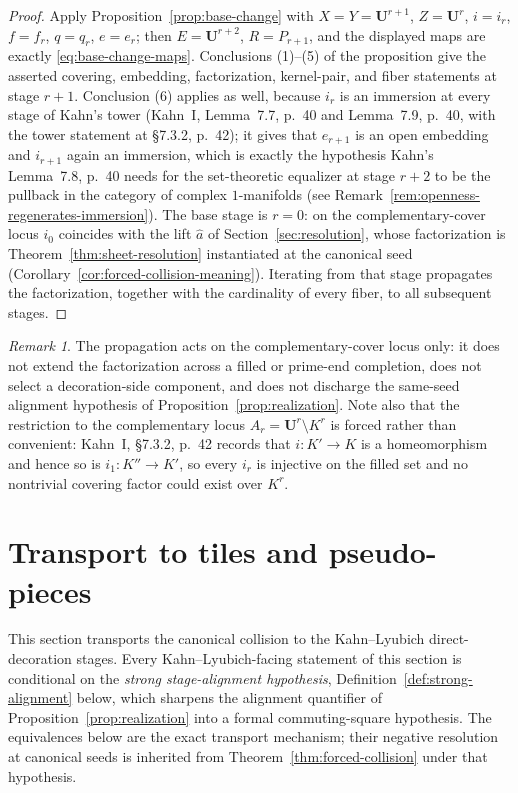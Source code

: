 \documentclass[11pt,reqno]{amsart}
\theoremstyle{definition}
\theoremstyle{remark}
\newtheorem{remark}[theorem]{Remark}
\begin{document}
\begin{proof}
Apply Proposition~\ref{prop:base-change} with \(X=Y=\mathbf U^{r+1}\), \(Z=\mathbf U^{r}\), \(i=i_r\), \(f=f_r\), \(q=q_r\), \(e=e_r\); then \(E=\mathbf U^{r+2}\), \(R=P_{r+1}\), and the displayed maps are exactly \eqref{eq:base-change-maps}.  Conclusions (1)--(5) of the proposition give the asserted covering, embedding, factorization, kernel-pair, and fiber statements at stage \(r+1\).  Conclusion (6) applies as well, because \(i_r\) is an immersion at every stage of Kahn's tower (Kahn~I, Lemma~7.7, p.~40 and Lemma~7.9, p.~40, with the tower statement at \S7.3.2, p.~42); it gives that \(e_{r+1}\) is an open embedding and \(i_{r+1}\) again an immersion, which is exactly the hypothesis Kahn's Lemma~7.8, p.~40 needs for the set-theoretic equalizer at stage \(r+2\) to be the pullback in the category of complex \(1\)-manifolds (see Remark~\ref{rem:openness-regenerates-immersion}).  The base stage is \(r=0\): on the complementary-cover locus \(i_0\) coincides with the lift \(\widehat a\) of Section~\ref{sec:resolution}, whose factorization is Theorem~\ref{thm:sheet-resolution} instantiated at the canonical seed (Corollary~\ref{cor:forced-collision-meaning}).  Iterating from that stage propagates the factorization, together with the cardinality of every fiber, to all subsequent stages.
\end{proof}

\begin{remark}
The propagation acts on the complementary-cover locus only: it does
not extend the factorization across a filled or prime-end completion,
does not select a decoration-side component, and does not discharge
the same-seed alignment hypothesis of
Proposition~\ref{prop:realization}.  Note also that the restriction to
the complementary locus \(A_r=\mathbf U^r\setminus K^r\) is forced
rather than convenient: Kahn~I, \S7.3.2, p.~42 records that
\(i\colon K'\to K\) is a homeomorphism and hence so is
\(i_1\colon K''\to K'\), so every \(i_r\) is injective on the filled
set and no nontrivial covering factor could exist over \(K^r\).
\end{remark}

\section{Transport to tiles and pseudo-pieces}
\label{sec:tiles}

This section transports the canonical collision to the Kahn--Lyubich
direct-decoration stages.  Every Kahn--Lyubich-facing statement of
this section is conditional on the \emph{strong stage-alignment
hypothesis}, Definition~\ref{def:strong-alignment} below, which
sharpens the alignment quantifier of
Proposition~\ref{prop:realization} into a formal commuting-square
hypothesis.  The equivalences below are the exact transport mechanism;
their negative resolution at canonical seeds is inherited from
Theorem~\ref{thm:forced-collision} under that hypothesis.
\end{document}
